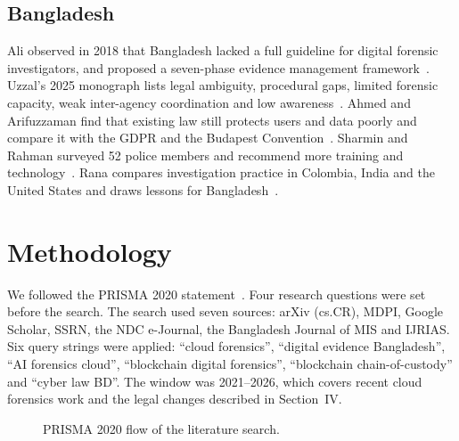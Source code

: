 \documentclass[conference]{IEEEtran}
\begin{document}
\subsection{Bangladesh}
Ali observed in 2018 that Bangladesh lacked a full guideline for digital forensic investigators, and proposed a seven-phase evidence management framework~\cite{ali}. Uzzal's 2025 monograph lists legal ambiguity, procedural gaps, limited forensic capacity, weak inter-agency coordination and low awareness~\cite{uzzal}. Ahmed and Arifuzzaman find that existing law still protects users and data poorly and compare it with the GDPR and the Budapest Convention~\cite{ahmed}. Sharmin and Rahman surveyed 52 police members and recommend more training and technology~\cite{sharmin}. Rana compares investigation practice in Colombia, India and the United States and draws lessons for Bangladesh~\cite{rana}.

\section{Methodology}
We followed the PRISMA 2020 statement~\cite{prisma}. Four research questions were set before the search. The search used seven sources: arXiv (cs.CR), MDPI, Google Scholar, SSRN, the NDC e-Journal, the Bangladesh Journal of MIS and IJRIAS. Six query strings were applied: ``cloud forensics'', ``digital evidence Bangladesh'', ``AI forensics cloud'', ``blockchain digital forensics'', ``blockchain chain-of-custody'' and ``cyber law BD''. The window was 2021--2026, which covers recent cloud forensics work and the legal changes described in Section~IV.

\begin{figure}[t]
\centering
{}
\caption{PRISMA 2020 flow of the literature search.}
\label{fig:prisma}
\end{figure}
\end{document}
